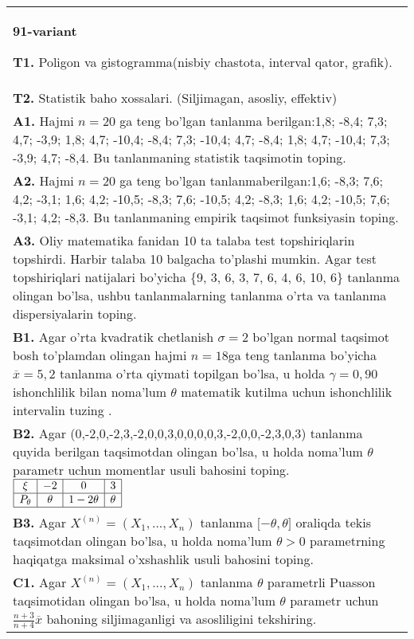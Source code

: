 \documentclass{article}
\begin{document}
\begin{tabular}{m{17cm}}
\textbf{91-variant}
\newline

\textbf{T1.} 
Poligon va gistogramma(nisbiy chastota, interval qator, grafik).
\\
\textbf{T2.} 
Statistik baho xossalari. (Siljimagan, asosliy, effektiv)
\\
\textbf{A1.} 
Hajmi \(n = 20\) ga teng bo'lgan tanlanma berilgan:1,8; -8,4; 7,3; 4,7; -3,9; 1,8; 4,7; -10,4; -8,4; 7,3; -10,4; 4,7; -8,4; 1,8; 4,7; -10,4; 7,3; -3,9; 4,7; -8,4. Bu tanlanmaning statistik taqsimotin toping.
\\
\textbf{A2.} 
Hajmi \(n = 20\) ga teng bo'lgan tanlanmaberilgan:1,6; -8,3; 7,6; 4,2; -3,1; 1,6; 4,2; -10,5; -8,3; 7,6; -10,5; 4,2; -8,3; 1,6; 4,2; -10,5; 7,6; -3,1; 4,2; -8,3. Bu tanlanmaning empirik taqsimot funksiyasin toping.
\\
\textbf{A3.} 
Oliy matematika fanidan 10 ta talaba test topshiriqlarin topshirdi. Harbir talaba 10 balgacha to'plashi mumkin. Agar test topshiriqlari natijalari bo'yicha \{9, 3, 6, 3, 7, 6, 4, 6, 10, 6\} tanlanma olingan bo'lsa, ushbu tanlanmalarning tanlanma o'rta va tanlanma dispersiyalarin toping.
\\
\textbf{B1.} 
Agar o'rta kvadratik chetlanish \(\sigma = 2\) bo'lgan normal taqsimot bosh to'plamdan olingan hajmi \(n = 18\)ga teng tanlanma bo'yicha \(\overline{x} = 5,2\) tanlanma o'rta qiymati topilgan bo'lsa, u holda \(\gamma = 0,90\) ishonchlilik bilan noma'lum \(\theta\) matematik kutilma uchun ishonchlilik intervalin tuzing .
\\
\textbf{B2.} 
Agar (0,-2,0,-2,3,-2,0,0,3,0,0,0,0,3,-2,0,0,-2,3,0,3) tanlanma quyida berilgan taqsimotdan olingan bo'lsa, u holda noma'lum \(\theta\) parametr uchun momentlar usuli bahosini toping.
$\begin{array}{|c|c|c|c|}
    \hline
    \xi & - 2 & 0 & 3 \\
    \hline
    P_{\theta} & \theta & 1 - 2\theta & \theta \\
    \hline
\end{array}$
\\
\textbf{B3.} 
Agar \(X^{(n)} = \left( X_{1},...,X_{n} \right)\) tanlanma \(\lbrack - \theta,\theta\rbrack\) oraliqda tekis taqsimotdan olingan bo'lsa, u holda noma'lum \(\theta > 0\) parametrning haqiqatga maksimal o'xshashlik usuli bahosini toping.
\\
\textbf{C1.} 
Agar \(X^{(n)} = \left( X_{1},...,X_{n} \right)\) tanlanma \(\theta\) parametrli Puasson taqsimotidan olingan bo'lsa, u holda noma'lum \(\theta\) parametr uchun \(\frac{n + 3}{n + 4}\overline{x}\) bahoning siljimaganligi va asosliligini tekshiring.

\end{tabular}
\end{document}
